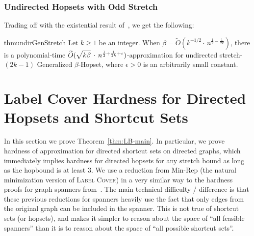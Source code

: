 \documentclass{article}
\theoremstyle{definition}
\theoremstyle{remark}
\newcommand{\LabelCover}{\textsc{Label Cover}}
\def\be    {\beta}
\def\hopset {{\sc Generalized $\beta$-Hopset}}
\begin{document}
\subsubsection{Undirected Hopsets with Odd Stretch}
Trading off with the existential result of~\cite{TZ05}, we get the following:
\begin{restatable}{thm}{undirGenStretch} \label{thm:undir_gen_stretch}
    Let $k \geq 1$ be an integer. When $\be = \widetilde{O}(k^{-1/2} \cdot \, n^{\frac{1}{2} - \frac{1}{2k}}) $, there is a polynomial-time $\widetilde{O}(\sqrt{k \be \vphantom{\be^k}} \, \cdot \, n^{\frac{1}{2} + \frac{1}{2k} + \epsilon})$-approximation for undirected stretch-$(2k-1)$ {\hopset}, where $\epsilon > 0$ is an arbitrarily small constant.
\end{restatable}

\fi






















 


\iflong
\section{Label Cover Hardness for Directed Hopsets and Shortcut Sets} \label{app:hardness}
In this section we prove Theorem~\ref{thm:LB-main}. 
 In particular, we prove hardness of approximation for directed shortcut sets on directed graphs, which immediately implies hardness for directed hopsets for any stretch bound as long as the hopbound is at least $3$.  We use a reduction from Min-Rep (the natural minimization version of \LabelCover) in a very similar way to the hardness proofs for graph spanners from~\cite{Kor01,EP07,DKR16,CD16}.  The main technical difficulty / difference is that these previous reductions for spanners heavily use the fact that only edges from the original graph can be included in the spanner.  This is not true of shortcut sets (or hopsets), and makes it simpler to reason about the space of ``all feasible spanners'' than it is to reason about the space of ``all possible shortcut sets''.  
\end{document}
